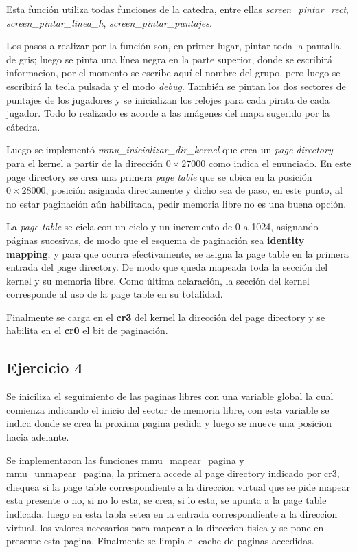 Esta función utiliza todas funciones de la catedra, entre ellas
{\it screen_pintar_rect\/}, {\it screen_pintar_linea_h\/},
{\it screen_pintar_puntajes\/}.

Los pasos a realizar por la función son, en primer lugar, pintar toda la
pantalla de gris; luego se pinta una línea negra en la parte superior, donde se
escribirá informacion, por el momento se escribe aquí el nombre del grupo, pero
luego se escribirá la tecla pulsada y el modo {\it debug\/}.
También se pintan los dos sectores de puntajes de los jugadores y se inicializan
los relojes para cada pirata de cada jugador. Todo lo realizado es acorde a las
imágenes del mapa sugerido por la cátedra.

Luego se implementó {\it mmu_inicializar_dir_kernel\/} que crea un
{\it page directory\/} para el kernel a partir de la dirección $0\times27000$
como indica el enunciado. En este page directory se crea una primera
{\it page table\/} que se ubica en la posición $0\times28000$, posición
asignada directamente y dicho sea de paso, en este punto, al no estar paginación
aún habilitada, pedir memoria libre no es una buena opción.

La {\it page table\/} se cicla con un ciclo y un incremento de 0 a 1024,
asignando páginas sucesivas, de modo que el esquema de paginación sea
{\bf identity mapping}; y para que ocurra efectivamente, se asigna la page table
en la primera entrada del page directory.
De modo que queda mapeada toda la sección del kernel y su memoria libre.
Como última aclaración, la sección del kernel corresponde al uso de la page
table en su totalidad.

Finalmente se carga en el {\bf cr3} del kernel la dirección del page
directory y se habilita en el {\bf cr0} el bit de paginación.


\subsection{Ejercicio 4}

Se iniciliza el seguimiento de las paginas libres con una variable global la cual comienza indicando el inicio
del sector de memoria libre, con esta variable se indica donde se crea la proxima pagina pedida y luego se mueve
una posicion hacia adelante.

Se implementaron las funciones mmu_mapear_pagina y mmu_unmapear_pagina, la primera accede al page directory
indicado por cr3, chequea si la page table correspondiente a la direccion virtual que se pide mapear esta presente o no,
si no lo esta, se crea, si lo esta, se apunta a la page table indicada. luego en esta tabla setea en la entrada correspondiente
a la direccion virtual, los valores necesarios para mapear a la direccion fisica y se pone en presente esta pagina.
Finalmente se limpia el cache de paginas accedidas.

